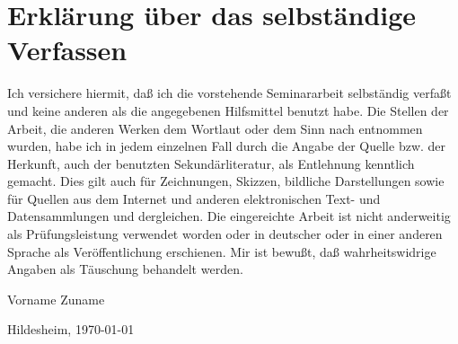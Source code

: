 \documentclass[12pt,        %
  english,ngerman,          %
  paper=a4,                 %
  captions=tablesignature,  %
  listof=numbered,          %
  bibliography=totoc,       %
  headings=small,           %
  headinclude=false,        %
  footinclude=false,        %
  parskip=half-,            %
  oneside,                  %
  DIV=12                    %
  ]{scrbook}                %
\begin{document}
\renewcommand{\thechapter}{\Alph{chapter}}
\renewcommand{\thesection}{\Alph{section}}
\renewcommand{\thesubsection}{\Alph{section}.\arabic{subsection}}

\chapter*{Erklärung über das selbständige Verfassen}
\thispagestyle{empty}

  {
    Ich versichere hiermit, daß ich die vorstehende Seminararbeit
    selbständig verfaßt und keine anderen als die angegebenen Hilfsmittel
    benutzt habe. Die Stellen der Arbeit, die anderen Werken dem Wortlaut
    oder dem Sinn nach entnommen wurden, habe ich in jedem einzelnen Fall
    durch die Angabe der Quelle bzw. der Herkunft, auch der benutzten
    Sekundärliteratur, als Entlehnung kenntlich gemacht. Dies gilt auch für
    Zeichnungen, Skizzen, bildliche Darstellungen sowie für Quellen aus dem 
    Internet und anderen elektronischen Text- und Datensammlungen und
    dergleichen. Die eingereichte Arbeit ist nicht anderweitig als
    Prüfungsleistung verwendet worden oder in deutscher oder in einer anderen 
    Sprache als Veröffentlichung erschienen. Mir ist bewußt, daß
    wahrheitswidrige Angaben als Täuschung behandelt werden.
  }


\vspace*{4cm}

Vorname Zuname

\vspace*{1cm}

Hildesheim, \today
\end{document}
